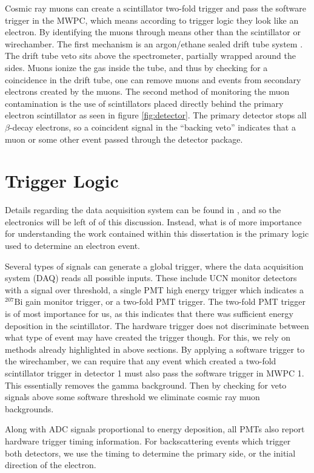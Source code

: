 Cosmic ray muons can create a scintillator two-fold trigger and pass the software trigger in
the MWPC, which means according to trigger logic they look like an electron. By identifying
the muons through means other than the scintillator or wirechamber. The first mechanism
is an argon/ethane sealed drift tube system \cite{rios2011sealed}. The drift tube veto sits
above the spectrometer, partially wrapped around the sides. Muons ionize the gas inside the
tube, and thus by checking for a coincidence in the drift tube, one can remove muons
and events from secondary electrons created by the muons. The second method of monitoring
the muon contamination is the use of scintillators placed directly behind the primary
electron scintillator as seen in figure \ref{fig:detector}. The primary detector
stops all $\beta$-decay electrons, so a coincident signal in the ``backing veto''
indicates that a muon or some other event passed through the detector package.

\section{Trigger Logic}

Details regarding the data acquisition system can be found in \cite{plaster2012,mpmThesis}, and
so the electronics will be left of of this discussion. Instead, what is of more importance for
understanding the work contained within this dissertation is the primary logic used to
determine an electron event.

Several types of signals can generate a global trigger, where the data acquisition system (DAQ)
reads all possible inputs. These include UCN monitor detectors with a signal over threshold,
a single PMT high energy trigger which indicates a $^{207}\mathrm{Bi}$ gain monitor trigger,
or a two-fold PMT trigger. The two-fold PMT trigger is of most importance for us, as this indicates
that there was sufficient energy deposition in the scintillator. The hardware trigger does not
discriminate between what type of event may have created the trigger though. For this, we rely
on methods already highlighted in above sections. By applying a software trigger to
the wirechamber, we can require that any event which created a two-fold scintillator trigger
in detector 1 must also pass the software trigger in MWPC 1. This essentially removes the
gamma background. Then by checking for veto signals above some software threshold we eliminate
cosmic ray muon backgrounds.

Along with ADC signals proportional to energy deposition, all PMTs also report hardware trigger
timing information. For backscattering events which trigger both detectors, we use the timing
to determine the primary side, or the initial direction of the electron.











